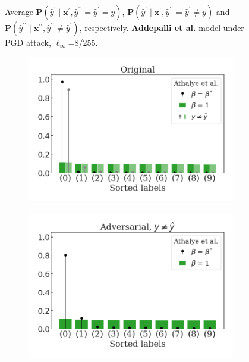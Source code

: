 \begin{figure}[H]
    \caption{Average $\mathbf{P}(\hat{y}^\prime \mid \mathbf{x}^\prime, \hat{y}^{\prime \prime} = \hat{y}^\prime = y)$,
    $\mathbf{P}(\hat{y}^\prime \mid \mathbf{x}^\prime, \hat{y}^{\prime \prime} = \hat{y}^\prime \neq y)$ and
    $\mathbf{P}(\hat{y}^{\prime \prime} \mid \mathbf{x}^{\prime \prime}, \hat{y}^{\prime \prime} \neq \hat{y}^\prime)$,
    respectively. {\color{tab:purple} \textbf{Addepalli et al.}} model under PGD attack, $\ell_\infty$=8/255.}
    \label{fig:pgd_distributions_addepalli2021}
\end{figure}
\begin{figure}[H]
    \centering
    \begin{subfigure}[b]{0.45\textwidth}
        \centering
        \includegraphics[width=\textwidth]{img/results_discussion/adversarial/BPDA_orig_PGD_0.0314.png}
    \end{subfigure}
    \hfill
    \begin{subfigure}[b]{0.45\textwidth}
        \centering
        \includegraphics[width=\textwidth]{img/results_discussion/adversarial/BPDA_adv_PGD_0.0314.png}
    \end{subfigure}


\end{figure}
